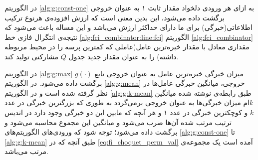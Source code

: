 در الگوریتم \ref{alg:g:const-one} به ازای هر ورودی دلخواد مقدار ثابت ۱ به عنوان خروجی برگشت داده می‌شود، این بدین معنی است که ارزش افزوده‌ی هرنوع ترکیب اطلاعاتی(خبرگی) برای ما دارای حداکثر ارزش می‌باشد و این مساله باعث می‌شود که نتیجه‌ی انتگرال فازی خط \ref{alg:fci_combinator:line:fci} الگوریتم \ref{alg:fci_combinator} مقداری معادل با مقدار خبره‌ترین عامل(عاملی که کمترین پرسه را در محیط مربوطه داشته) را به عنوان مقدار جدید جدول $Q$ مشارکتی تولید کند.

در الگوریتم \ref{alg:g:max} میزان خبرگی خبره‌ترین عامل به عنوان خروجی تابع $g(\cdot)$ برگشت داده می‌شود. در الگوریتم \ref{alg:g:mean} خروجی، میانگین خبرگی عامل‌ها در نظر گرفته شده است و در الگوریتم \ref{alg:g:k-mean} طبق رابطه‌ی نوشته شده میانگین $k$ام میزان خبرگی‌ها به عنوان خروجی برمی‌گردد به طوری که بزرگترین خبرگی در عدد $k$ و کوچکترین خبرگی در عدد ۱ و هر آنچه که مابین این دو خبرگی وجود دارد در اندیس ترتیب مرتب شده آن‌ها ضرب می‌شود و میانگین این مجموع محاسبه می‌شود و برگشت داده می‌شود؛ توجه شود که ورودی‌های الگوریتم‌های \ref{alg:g:const-one} تا \ref{alg:g:k-mean} طبق آنچه که در \ref{eq:fi_choquet_perm_val} آمده است یک مجموعه‌ی مرتب می‌باشد.